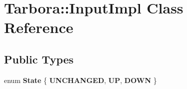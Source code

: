 \hypertarget{classTarbora_1_1InputImpl}{}\section{Tarbora\+:\+:Input\+Impl Class Reference}
\label{classTarbora_1_1InputImpl}
\subsection*{Public Types}
\begin{DoxyCompactItemize}
\item 
\mbox{\label{classTarbora_1_1InputImpl_a15834d224b064df6e1e8b70bbcc0a082}} 
enum {\bfseries State} \{ {\bfseries U\+N\+C\+H\+A\+N\+G\+ED}, 
{\bfseries UP}, 
{\bfseries D\+O\+WN}
 \}
\end{DoxyCompactItemize}
